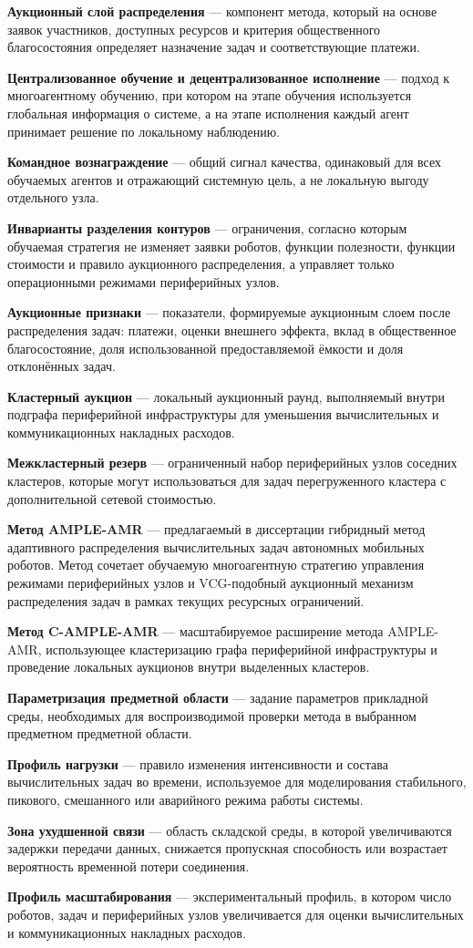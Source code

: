 \textbf{Аукционный слой распределения} --- компонент метода, который на основе заявок участников, доступных ресурсов и критерия общественного благосостояния определяет назначение задач и соответствующие платежи.

\textbf{Централизованное обучение и децентрализованное исполнение} --- подход к многоагентному обучению, при котором на этапе обучения используется глобальная информация о системе, а на этапе исполнения каждый агент принимает решение по локальному наблюдению.

\textbf{Командное вознаграждение} --- общий сигнал качества, одинаковый для всех обучаемых агентов и отражающий системную цель, а не локальную выгоду отдельного узла.

\textbf{Инварианты разделения контуров} --- ограничения, согласно которым обучаемая стратегия не изменяет заявки роботов, функции полезности, функции стоимости и правило аукционного распределения, а управляет только операционными режимами периферийных узлов.

\textbf{Аукционные признаки} --- показатели, формируемые аукционным слоем после распределения задач: платежи, оценки внешнего эффекта, вклад в общественное благосостояние, доля использованной предоставляемой ёмкости и доля отклонённых задач.

\textbf{Кластерный аукцион} --- локальный аукционный раунд, выполняемый внутри подграфа периферийной инфраструктуры для уменьшения вычислительных и коммуникационных накладных расходов.

\textbf{Межкластерный резерв} --- ограниченный набор периферийных узлов соседних кластеров, которые могут использоваться для задач перегруженного кластера с дополнительной сетевой стоимостью.

\textbf{Метод AMPLE-AMR } --- предлагаемый в диссертации гибридный метод адаптивного распределения вычислительных задач автономных мобильных роботов. Метод сочетает обучаемую многоагентную стратегию управления режимами периферийных узлов и VCG-подобный аукционный механизм распределения задач в рамках текущих ресурсных ограничений.

\textbf{Метод C-AMPLE-AMR} --- масштабируемое расширение метода AMPLE-AMR, использующее кластеризацию графа периферийной инфраструктуры и проведение локальных аукционов внутри выделенных кластеров.

\textbf{Параметризация предметной области} --- задание параметров прикладной среды, необходимых для воспроизводимой проверки метода в выбранном предметном предметной области.

\textbf{Профиль нагрузки} --- правило изменения интенсивности и состава вычислительных задач во времени, используемое для моделирования стабильного, пикового, смешанного или аварийного режима работы системы.

\textbf{Зона ухудшенной связи} --- область складской среды, в которой увеличиваются задержки передачи данных, снижается пропускная способность или возрастает вероятность временной потери соединения.

\textbf{Профиль масштабирования} --- экспериментальный профиль, в котором число роботов, задач и периферийных узлов увеличивается для оценки вычислительных и коммуникационных накладных расходов.

